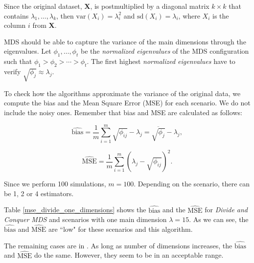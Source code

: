 \documentclass[11pt]{report}
\begin{document}
\indent Since the original dataset, \textbf{X}, is postmultiplied by a diagonal 
matrix $k \times k$ that contains $\lambda_1, \dots, \lambda_k$, then 
$\mbox{var}(X_i) = \lambda_i^2$ and $\mbox{sd}(X_i) = \lambda_i$, where
$X_i$ is the column $i$ from \textbf{X}.

\indent MDS should be able to capture the variance of the main dimensions 
through the eigenvalues. Let $\phi_1, \dots, \phi_t$ be the 
\textit{normalized eigenvalues} of the MDS configuration such that 
$\phi_1 > \phi_2 > \cdots > \phi_t$. The first highest
\textit{normalized eigenvalues} have to verify $\sqrt{\phi_j} \approx \lambda_j$.


\indent To check how the algorithms approximate the variance of the original 
data, we compute the bias and the Mean Square Error (MSE) for each scenario. 
We do not include the noisy ones. Remember that bias and MSE are calculated as 
follows:

$$
\widehat{\mbox{bias}} = \frac{1}{m}\sum_{i=1}^m \sqrt{\phi_{ij}} - \lambda_j = \overline{\sqrt{\phi_j}} - \lambda_j,
$$

$$
\widehat{\mbox{MSE}} = \frac{1}{m} \sum_{i = 1} ^m (\lambda_j - \sqrt{\phi_{ij}})^2.
$$


\indent Since we perform 100 simulations, $m = 100$. Depending on the 
scenario, there can be 1, 2 or 4 estimators. 

\indent Table \ref{mse_divide_one_dimensions} shows the $\widehat{\mbox{bias}}$
and the $\widehat{\mbox{MSE}}$ for \textit{Divide and Conquer MDS} and scenarios 
with one main dimension $\lambda = 15$. As we can see, the 
$\widehat{\mbox{bias}}$ and $\widehat{\mbox{MSE}}$ are ``low" for these 
scenarios and this algorithm.

\indent The remaining cases are in . As long as number of 
dimensions increases, the $\widehat{\mbox{bias}}$ and $\widehat{\mbox{MSE}}$ 
do the same. However, they seem to be in an acceptable range.
\end{document}
